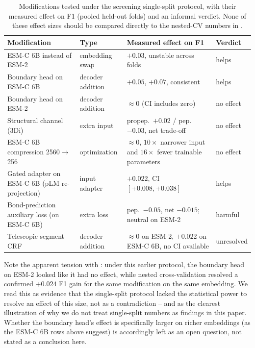 \documentclass{article}
\begin{document}
\begin{table}[h]
\centering
\caption{Modifications tested under the screening single-split protocol, with their measured effect on F1 (pooled held-out folds) and an informal verdict. None of these effect sizes should be compared directly to the nested-CV numbers in .}
\label{tab:verdict}
\small
\begin{tabular}{p{3.4cm} p{2.1cm} p{4.6cm} p{1.7cm}}
\toprule
\textbf{Modification} & \textbf{Type} & \textbf{Measured effect on F1} & \textbf{Verdict} \\
\midrule
ESM-C 6B instead of ESM-2 & embedding swap & $+0.03$, unstable across folds & helps \\
Boundary head on ESM-C 6B & decoder addition & $+0.05$, $+0.07$, consistent & helps \\
Boundary head on ESM-2 & decoder addition & $\approx 0$ (CI includes zero) & no effect \\
Structural channel (3Di) & extra input & propep.\ $+0.02$ / pep.\ $-0.03$, net trade-off & no effect \\
ESM-C 6B compression 2560$\to$256 & optimization & $\approx 0$, $10\times$ narrower input and $16\times$ fewer trainable parameters & no effect \\
Gated adapter on ESM-C 6B (pLM re-projection) & input adapter & $+0.022$, CI $[+0.008, +0.038]$ & helps \\
Bond-prediction auxiliary loss (on ESM-C 6B) & extra loss & pep.\ $-0.05$, net $-0.015$; neutral on ESM-2 & harmful \\
Telescopic segment CRF & decoder addition & $\approx 0$ on ESM-2, $+0.022$ on ESM-C 6B, no CI available & unresolved \\
\bottomrule
\end{tabular}
\end{table}

Note the apparent tension with : under this earlier protocol, the boundary head on ESM-2 looked like it had no effect, while nested cross-validation resolved a confirmed $+0.024$ F1 gain for the same modification on the same embedding. We read this as evidence that the single-split protocol lacked the statistical power to resolve an effect of this size, not as a contradiction -- and as the clearest illustration of why we do not treat single-split numbers as findings in this paper. Whether the boundary head's effect is specifically larger on richer embeddings (as the ESM-C 6B rows above suggest) is accordingly left as an open question, not stated as a conclusion here.
\end{document}
